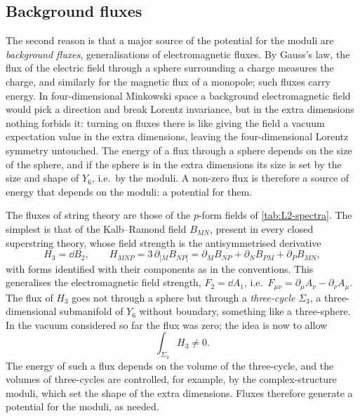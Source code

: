 \subsection{Background fluxes}

The second reason is that a major source of the potential for the moduli are \emph{background fluxes}, generalisations of electromagnetic fluxes. By Gauss's law, the flux of the electric field through a sphere surrounding a charge measures the charge, and similarly for the magnetic flux of a monopole; such fluxes carry energy. In four-dimensional Minkowski space a background electromagnetic field would pick a direction and break Lorentz invariance, but in the extra dimensions nothing forbids it: turning on fluxes there is like giving the field a vacuum expectation value in the extra dimensions, leaving the four-dimensional Lorentz symmetry untouched. The energy of a flux through a sphere depends on the size of the sphere, and if the sphere is in the extra dimensions its size is set by the size and shape of $Y_6$, i.e.\ by the moduli. A non-zero flux is therefore a source of energy that depends on the moduli: a potential for them.

The fluxes of string theory are those of the $p$-form fields of \cref{tab:L2-spectra}. The simplest is that of the Kalb--Ramond field $B_{MN}$, present in every closed superstring theory, whose field strength is the antisymmetrised derivative
\begin{equation}
  H_3 = \dd B_2 ,\qquad
  H_{MNP} = 3\,\partial_{[M}B_{NP]} = \partial_MB_{NP} + \partial_NB_{PM} + \partial_PB_{MN} ,
  \label{eq:L3-H3}
\end{equation}
with forms identified with their components as in the conventions. This generalises the electromagnetic field strength, $F_2 = \dd A_1$, i.e.\ $F_{\mu\nu} = \partial_\mu A_\nu - \partial_\nu A_\mu$.
The flux of $H_3$ goes not through a sphere but through a \emph{three-cycle} $\Sigma_3$, a three-dimensional submanifold of $Y_6$ without boundary, something like a three-sphere. In the vacuum considered so far the flux was zero; the idea is now to allow
\begin{equation}
  \int_{\Sigma_3}H_3 \neq 0 .
  \label{eq:L3-flux}
\end{equation}
The energy of such a flux depends on the volume of the three-cycle, and the volumes of three-cycles are controlled, for example, by the complex-structure moduli, which set the shape of the extra dimensions. Fluxes therefore generate a potential for the moduli, as needed.

